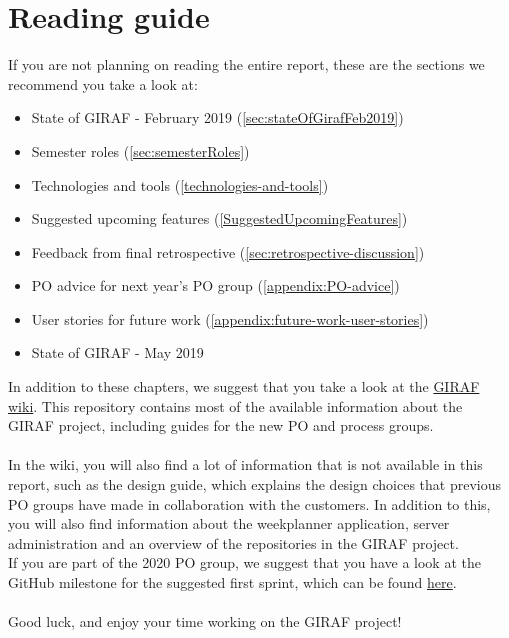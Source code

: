\chapter*{Reading guide}
If you are not planning on reading the entire report, these are the sections we recommend you take a look at:

\begin{itemize}
    \item State of GIRAF - February 2019 (\autoref{sec:stateOfGirafFeb2019})
    \item Semester roles (\autoref{sec:semesterRoles})
    \item Technologies and tools (\autoref{technologies-and-tools})
    \item Suggested upcoming features (\autoref{SuggestedUpcomingFeatures})
    \item Feedback from final retrospective (\autoref{sec:retrospective-discussion})
    \item PO advice for next year's PO group (\autoref{appendix:PO-advice})
    \item User stories for future work (\autoref{appendix:future-work-user-stories})
    \item State of GIRAF - May 2019 
\end{itemize}
\noindent
In addition to these chapters, we suggest that you take a look at the \href{https://github.com/aau-giraf/wiki}{GIRAF wiki}.
This repository contains most of the available information about the GIRAF project, including guides for the new PO and process groups.
\\\\
In the wiki, you will also find a lot of information that is not available in this report, such as the design guide, which explains the design choices that previous PO groups have made in collaboration with the customers.
In addition to this, you will also find information about the weekplanner application, server administration and an overview of the repositories in the GIRAF project.
\\
If you are part of the 2020 PO group, we suggest that you have a look at the GitHub milestone for the suggested first sprint, which can be found \href{https://github.com/issues?utf8=%E2%9C%93&q=milestone%3A%222020S1%22+user%3Aaau-giraf+is%3Aopen+}{here}.
\\\\
Good luck, and enjoy your time working on the GIRAF project!
